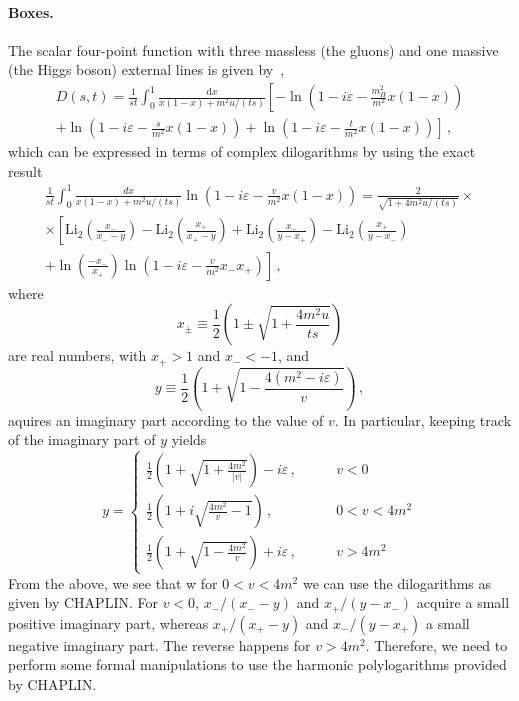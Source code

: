 \documentclass[12pt,a4wide]{article}
\begin{document}
\paragraph{Boxes.} The scalar four-point function with three massless
(the gluons) and one massive (the Higgs boson) external lines is given
by~\cite{Baur:1989cm},
\begin{multline}
  \label{eq:box}
	D(s, t) = \frac{1}{st} \int_{0}^{1} \frac{\mathrm{d}x}{x(1-x)+m^2u/(ts)} \left [- \ln\left ( 1 - i \varepsilon - \frac{m_H^2}{m^2} x (1-x) \right )\right. \\ \left.
	+ \ln\left ( 1 - i \varepsilon - \frac{s}{m^2} x (1-x) \right ) + \ln\left ( 1 - i \varepsilon - \frac{t}{m^2} x (1-x) \right ) \right ] \,, 
\end{multline}
which can be expressed in terms of complex dilogarithms by using the exact result
\begin{multline}
  \label{eq:ci-dilogs}
  \frac{1}{st} \int_{0}^{1} \frac{dx}{x(1-x)+m^2u/(ts)} \ln\left ( 1 - i \varepsilon - \frac{v}{m^2} x (1-x) \right )= \frac{2}{\sqrt{1+4m^2u/(ts)}} \times  \\ \times
  \left[
    \mathrm{Li}_2\left(\frac{x_-}{x_--y}\right)-\mathrm{Li}_2\left(\frac{x_+}{x_+-y}\right)
    +\mathrm{Li}_2\left(\frac{x_-}{y-x_+}\right)-\mathrm{Li}_2\left(\frac{x_+}{y-x_-}\right)
    \right.
    \\ \left.
    + \ln\left( \frac{-x_{-}}{x_{+}} \right) \ln\left ( 1 - i \varepsilon - \frac{v}{m^2}x_-x_+ \right )
    \right]\,,
  \end{multline}
  where
  \begin{equation}
    \label{eq:xpm}
    	x_{\pm} \equiv \frac{1}{2} \left ( 1 \pm \sqrt{1 + \frac{4m^2 u}{ts}} \right )
  \end{equation}
are real numbers, with $x_+>1$ and $x_-<-1$, and
\begin{equation}
  \label{eq:y-def}
  y \equiv \frac{1}{2} \left ( 1 + \sqrt{1 - \frac{4(m^2 - i \varepsilon)}{v}} \right ) \,,
\end{equation}
aquires an imaginary part according to the value of $v$. In particular, keeping track of the imaginary part of $y$ yields
\begin{equation}
  \label{eq:y-implementation}
y = \left\{
  \begin{split}
  \frac{1}{2}\left(1+\sqrt{1+\frac{4m^2}{|v|}}\right)-i\varepsilon\,,& \qquad v<0\\
  \frac{1}{2}\left(1+i\sqrt{\frac{4m^2}{v}-1}\right)\,,& \qquad 0<v<4 m^2\\
    \frac{1}{2}\left(1+\sqrt{1-\frac{4m^2}{v}}\right)+i\varepsilon\,,& \qquad v>4m^2
  \end{split}
  \right.
\end{equation}
From the above, we see that w for $0<v<4 m^2$ we can use the
dilogarithms as given by CHAPLIN.
%
For $v<0$, $x_-/(x_--y)$ and $x_+/(y-x_-)$ acquire a small positive
imaginary part, whereas $x_+/(x_+-y)$ and $x_-/(y-x_+)$ a small
negative imaginary part. The reverse happens for $v>4m^2$. Therefore,
we need to perform some formal manipulations to use the harmonic
polylogarithms provided by CHAPLIN.
\end{document}
